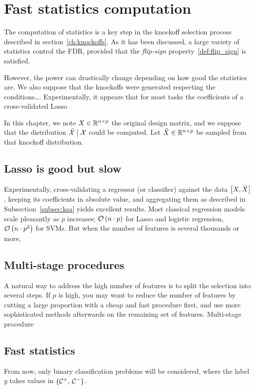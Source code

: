 \chapter{Fast statistics computation}\label{ch:fsc}

The computation of statistics is a key step in the knockoff selection process described in section~\ref{ch:knockoffs}.
As it has been discussed, a large variety of statistics control the FDR,
provided that the \textit{flip-sign} property~\ref{def:flip_sign} is satisfied.

However, the power can drastically change depending on how good the statistics are.
We also suppose that the knockoffs were generated respecting the conditions\dots.
Experimentally, it appears that for most tasks the coefficients of a cross-validated Lasso

In this chapter, we note $X \in \mathbb{R}^{n \times p}$ the original design matrix,
and we suppose that the distribution $\tilde{\mathcal{X}} \mid \mathcal{X}$ could be computed.
Let $\tilde{X} \in \mathbb{R}^{n \times p}$ be sampled from that knockoff distribution.

\section{Lasso is good but slow}\label{sec:}

Experimentally, cross-validating a regressor (or classifier) against the data $\big[ X, \tilde{X} \big]$,
keeping its coefficients in absolute value,
and aggregating them as described in Subsection~\ref{subsec:ksa} yields excellent results.
Most classical regression models scale pleasantly as $p$ increases;
$\mathcal{O}\left( n \cdot p \right)$ for Lasso and logistic regression,
$\mathcal{O}\left( n \cdot p^2 \right)$ for SVMs.
But when the number of features is several thousands or more,

\section{Multi-stage procedures}\label{sec:multi_stage}

A natural way to address the high number of features is to split the selection into several steps.
If $p$ is high,
you may want to reduce the number of features by cutting a large proportion with a cheap and fast procedure first,
and use more sophisticated methods afterwards on the remaining set of features.
Multi-stage procedure~\cite{multi_stage_fdr}

\section{Fast statistics}\label{sec:a}

From now, only binary classification problems will be considered, where the label $y$ takes values
in $\left\{ \mathcal{C}^+,\, \mathcal{C}^- \right\}$.
